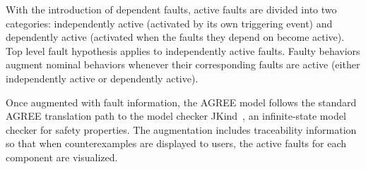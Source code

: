 With the introduction of dependent faults, active faults are divided into two categories: independently active (activated by its own triggering event) and dependently active (activated when the faults they depend on become active). Top level fault hypothesis applies to independently active faults. Faulty behaviors augment nominal behaviors whenever their corresponding faults are active (either independently active or dependently active).

Once augmented with fault information, the AGREE model follows the standard AGREE translation path to the model checker JKind~\cite{2017arXiv171201222G}, an infinite-state model checker for safety properties.  The augmentation includes traceability information so that when counterexamples are displayed to users, the active faults for each component are visualized.
